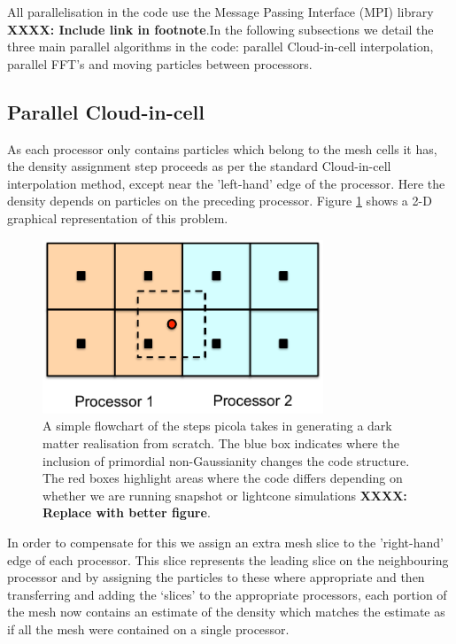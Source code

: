\documentclass[5p,authoryear]{elsarticle}
\begin{document}
All parallelisation in the code use the Message Passing Interface (MPI) library \textbf{XXXX: Include link in footnote}.In the following subsections we detail the three main parallel algorithms in the code: parallel Cloud-in-cell interpolation, parallel FFT's and moving particles between processors.

\subsection{Parallel Cloud-in-cell}

As each processor only contains particles which belong to the mesh cells it has, the density assignment step proceeds as per the standard Cloud-in-cell interpolation method, except near the 'left-hand' edge of the processor. Here the density depends on particles on the preceding processor. Figure \ref{cloudincell} shows a 2-D graphical representation of this problem.

\begin{figure}
\centering
\includegraphics[width=84mm]{cloudincell.pdf}
  \caption{A simple flowchart of the steps {\sc picola} takes in generating a dark matter realisation from scratch. The blue box indicates where the inclusion of primordial non-Gaussianity changes the code structure. The red boxes highlight areas where the code differs depending on whether we are running snapshot or lightcone simulations \textbf{XXXX: Replace with better figure}.}
  \label{cloudincell}
\end{figure}

In order to compensate for this we assign an extra mesh slice to the 'right-hand' edge of each processor. This slice represents the leading slice on the neighbouring processor and by assigning the particles to these where appropriate and then transferring and adding the `slices' to the appropriate processors, each portion of the mesh now contains an estimate of the density which matches the estimate as if all the mesh were contained on a single processor. 
\end{document}
